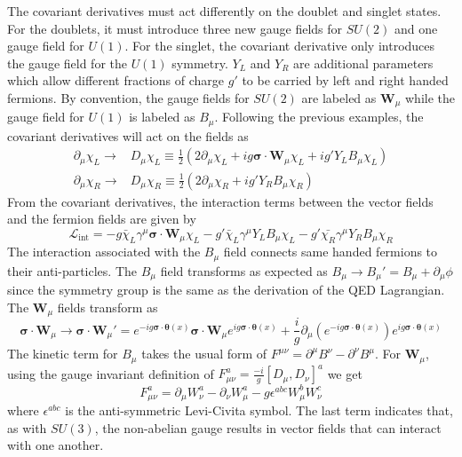 The covariant derivatives must act differently on the doublet and singlet states. For the doublets, it must introduce three new gauge fields for $SU(2)$ and one gauge field for $U(1)$. For the singlet, the covariant derivative only introduces the gauge field for the $U(1)$ symmetry. $Y_L$ and $Y_R$ are additional parameters which allow different fractions of charge $g'$ to be carried by left and right handed fermions. By convention, the gauge fields for $SU(2)$ are labeled as $\mathbf{W}_\mu$ while the gauge field for $U(1)$ is labeled as $B_\mu$. Following the previous examples, the covariant derivatives will act on the fields as
\begin{align}
	\label{eq:ew_cov_derivative}
	\partial_\mu\chi_L\to&D_\mu\chi_L\equiv\frac{1}{2}\left(2\partial_\mu\chi_L+ig\boldsymbol{\sigma}\cdot\mathbf{W}_\mu\chi_L+ig'Y_{L}B_\mu\chi_L\right)\\
	\partial_\mu\chi_R\to&D_\mu\chi_R\equiv\frac{1}{2}\left(2\partial_\mu\chi_R+ig'Y_{R}B_\mu\chi_R\right)
\end{align}
From the covariant derivatives, the interaction terms between the vector fields and the fermion fields are given by
\begin{equation}
	\label{eq:ew_interaction}
	\mathcal{L}_\text{int}=-g\bar{\chi}_L\gamma^\mu\boldsymbol{\sigma}\cdot\mathbf{W}_\mu\chi_L-g'\bar{\chi}_L\gamma^\mu Y_{L}B_\mu\chi_L-g'\bar{\chi_R}\gamma^\mu Y_{R} B_\mu\chi_R
\end{equation}
The interaction associated with the $B_\mu$ field connects same handed fermions to their anti-particles. The $B_\mu$ field transforms as expected as $B_\mu\to B_\mu'=B_\mu+\partial_\mu\phi$ since the symmetry group is the same as the derivation of the QED Lagrangian. The $\mathbf{W}_\mu$ fields transform as
\begin{equation}
	\boldsymbol{\sigma}\cdot\mathbf{W}_\mu\to\boldsymbol{\sigma}\cdot\mathbf{W}_\mu'=e^{-ig\boldsymbol{\sigma}\cdot\boldsymbol{\theta}(x)}\boldsymbol{\sigma}\cdot\mathbf{W}_\mu e^{ig\boldsymbol{\sigma}\cdot\boldsymbol{\theta}(x)}+\frac{i}{g}\partial_\mu\left(e^{-ig\boldsymbol{\sigma}\cdot\boldsymbol{\theta}(x)}\right)e^{ig\boldsymbol{\sigma}\cdot\boldsymbol{\theta}(x)}
\end{equation}
The kinetic term for $B_\mu$ takes the usual form of $F^{\mu\nu}=\partial^\mu B^\nu-\partial^\nu B^\mu$. For $\mathbf{W}_\mu$, using the gauge invariant definition of $F^{a}_{\mu\nu}=\frac{-i}{g}[D_\mu,D_\nu]^a$ we get
\begin{equation}
	F^{a}_{\mu\nu}=\partial_\mu W_\nu^a-\partial_\nu W_\mu^a-g\epsilon^{abc}W_\mu^bW_\nu^c
\end{equation}
where $\epsilon^{abc}$ is the anti-symmetric Levi-Civita symbol. The last term indicates that, as with $SU(3)$, the non-abelian gauge results in vector fields that can interact with one another.

